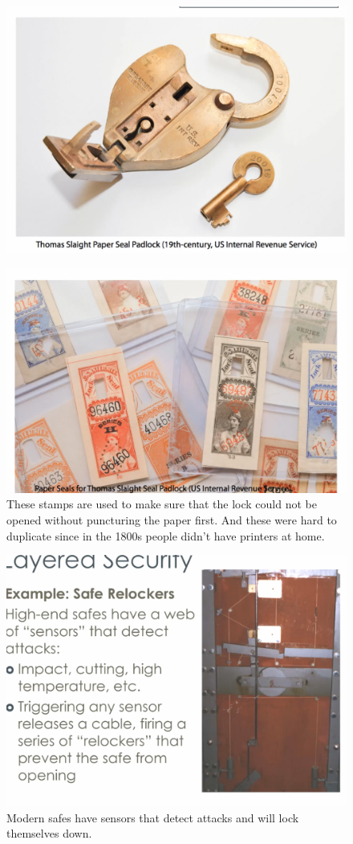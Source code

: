 \documentclass[../notes.tex]{subfiles}
\begin{document}
\begin{figure}[H]
    \centering
    \includegraphics[width=0.8\linewidth]{img/image_2023-04-16-21-19-03.png}
\end{figure}

\begin{figure}[H]
    \centering
    \includegraphics[width=0.8\linewidth]{img/image_2023-04-16-21-19-11.png}
    \caption{These stamps are used to make sure that the lock could not be opened without puncturing the paper first. And these were hard to duplicate since in the 1800s people didn't have printers at home.}
\end{figure}

\begin{figure}[H]
    \centering
    \includegraphics[width=0.8\linewidth]{img/image_2023-04-16-21-20-21.png}
    \caption{Modern safes have sensors that detect attacks and will lock themselves down.}
\end{figure}
\end{document}
